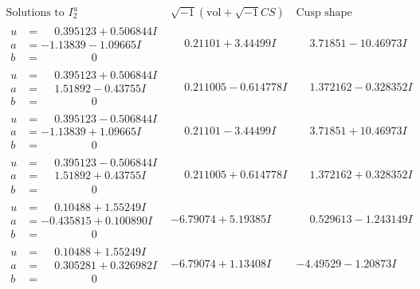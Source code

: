 \documentclass[1p]{elsarticle_modified}
\theoremstyle{definition}
\newcommand{\I}{\sqrt{-1}}
\begin{document}
$$\begin{array}{c|c|c}  
\text{Solutions to }I^u_{2}& \I (\text{vol} + \sqrt{-1}CS) & \text{Cusp shape}\\
 \hline 
\begin{aligned}
u &= \phantom{-}0.395123 + 0.506844 I \\
a &= -1.13839 - 1.09665 I \\
b &= \phantom{-0.000000 } 0\end{aligned}
 & \phantom{-}0.21101 + 3.44499 I & \phantom{-}3.71851 - 10.46973 I \\ \hline\begin{aligned}
u &= \phantom{-}0.395123 + 0.506844 I \\
a &= \phantom{-}1.51892 - 0.43755 I \\
b &= \phantom{-0.000000 } 0\end{aligned}
 & \phantom{-}0.211005 - 0.614778 I & \phantom{-}1.372162 - 0.328352 I \\ \hline\begin{aligned}
u &= \phantom{-}0.395123 - 0.506844 I \\
a &= -1.13839 + 1.09665 I \\
b &= \phantom{-0.000000 } 0\end{aligned}
 & \phantom{-}0.21101 - 3.44499 I & \phantom{-}3.71851 + 10.46973 I \\ \hline\begin{aligned}
u &= \phantom{-}0.395123 - 0.506844 I \\
a &= \phantom{-}1.51892 + 0.43755 I \\
b &= \phantom{-0.000000 } 0\end{aligned}
 & \phantom{-}0.211005 + 0.614778 I & \phantom{-}1.372162 + 0.328352 I \\ \hline\begin{aligned}
u &= \phantom{-}0.10488 + 1.55249 I \\
a &= -0.435815 + 0.100890 I \\
b &= \phantom{-0.000000 } 0\end{aligned}
 & -6.79074 + 5.19385 I & \phantom{-}0.529613 - 1.243149 I \\ \hline\begin{aligned}
u &= \phantom{-}0.10488 + 1.55249 I \\
a &= \phantom{-}0.305281 + 0.326982 I \\
b &= \phantom{-0.000000 } 0\end{aligned}
 & -6.79074 + 1.13408 I & -4.49529 - 1.20873 I \\ \hline\begin{aligned}

\end{aligned}
\end{array}$$
\end{document}
